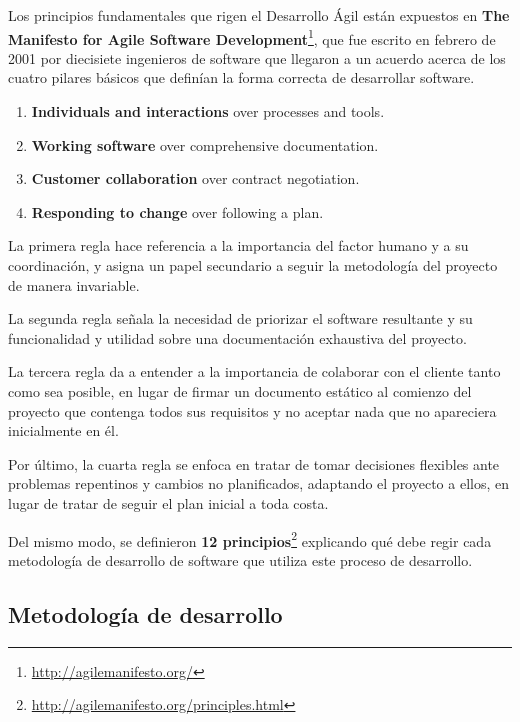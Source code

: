 Los principios fundamentales que rigen el Desarrollo Ágil están expuestos en \textbf{The Manifesto for Agile Software Development}\footnote{\url{http://agilemanifesto.org/}}, que fue escrito en febrero de 2001 por diecisiete ingenieros de software que llegaron a un acuerdo acerca de los cuatro pilares básicos que definían la forma correcta de desarrollar software.

\begin{center}
\begin{tcolorbox}[sharp corners,  colframe=white]
\begin{enumerate}
    \item \textbf{Individuals and interactions} over processes and tools.
    \item \textbf{Working software} over comprehensive documentation.
    \item \textbf{Customer collaboration} over contract negotiation.
    \item \textbf{Responding to change} over following a plan.
\end{enumerate}
\end{tcolorbox}
\end{center}

La primera regla hace referencia a la importancia del factor humano y a su coordinación, y asigna un papel secundario a seguir la metodología del proyecto de manera invariable.

La segunda regla señala la necesidad de priorizar el software resultante y su funcionalidad y utilidad sobre una documentación exhaustiva del proyecto.

La tercera regla da a entender a la importancia de colaborar con el cliente tanto como sea posible, en lugar de firmar un documento estático al comienzo del proyecto que contenga todos sus requisitos y no aceptar nada que no apareciera inicialmente en él.

Por último, la cuarta regla se enfoca en tratar de tomar decisiones flexibles ante problemas repentinos y cambios no planificados, adaptando el proyecto a ellos, en lugar de tratar de seguir el plan inicial a toda costa.

Del mismo modo, se definieron \textbf{12 principios}\footnote{\url{http://agilemanifesto.org/principles.html}} explicando qué debe regir cada metodología de desarrollo de software que utiliza este proceso de desarrollo.

\subsection{Metodología de desarrollo}

